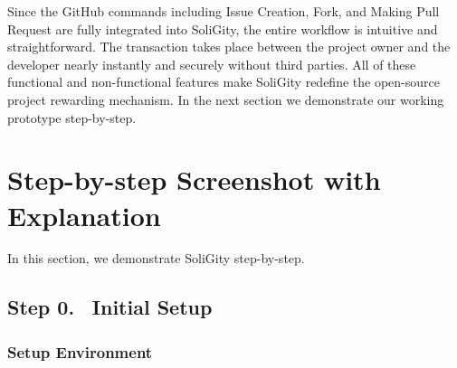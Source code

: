 \documentclass[12pt]{article}
\renewcommand{\_}{\kern-1.5pt\textunderscore\kern-1.5pt}
\begin{document}
\noindent Since the GitHub commands including Issue Creation, Fork, and Making Pull Request are fully integrated into SoliGity, the entire workflow is intuitive and straightforward. The transaction takes place between the project owner and the developer nearly instantly and securely without third parties. All of these functional and non-functional features make SoliGity redefine the open-source project rewarding mechanism. In the next section we demonstrate our working prototype step-by-step.

\section{Step-by-step Screenshot with Explanation}
In this section, we demonstrate SoliGity step-by-step.


\renewcommand\thesubsection{Step \arabic{subsection}.}
\renewcommand\thesubsubsection{\arabic{subsubsection}.}

\subsection*{Step 0. \(\;\;\)Initial Setup}

\subsubsection{Setup Environment}




\end{document}
